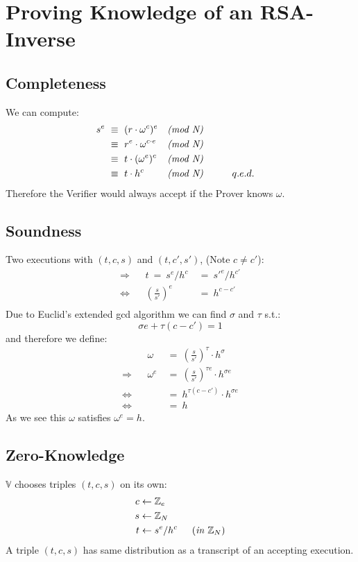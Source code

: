 \documentclass{report}
\begin{document}
	\section{Proving Knowledge of an RSA-Inverse}
	\startsection
		\subsection{Completeness}
		\startsection
			We can compute:
			\begin{align*}
				s^e \ & \equiv \ (r \cdot \omega^c) ^e & \textit{(mod N)} \\
				& \equiv \ r^e \cdot \omega ^{c \cdot e} & \textit{(mod N)} \\
				& \equiv \ t \cdot (\omega^e)^c & \textit{(mod N)} \\
				& \equiv \ t \cdot h^c & \textit{(mod N)} & \indent \indent q.e.d.
			\end{align*}
			Therefore the Verifier would always accept if the Prover knows $\omega$. \\
		\closesection
		\subsection{Soundness}
		\startsection
			Two executions with $(t,c,s)$ and $(t,c',s')$, (Note $c \neq c'$):
			\begin{align*}
				\Rightarrow && t \ = \ s^e / h^c \ & = \ s'^e / h^{c'} \\
				\Leftrightarrow && \left( \frac{s}{s'} \right) ^e \ & = \ h^{c-c'} \\
			\end{align*}
			Due to Euclid's extended gcd algorithm we can find $\sigma$ and $\tau$ s.t.:
			\[
				\sigma e + \tau(c-c') = 1
			\]
			and therefore we define:
			\begin{align*}
				&& \omega \ & = \ \left( \frac{s}{s'} \right) ^{\tau} \cdot h^{\sigma} \\
				\Rightarrow &&  \omega^e \ & = \ \left( \frac{s}{s'} \right) ^{\tau e} \cdot h^{\sigma e} \\
				\Leftrightarrow &&& = \ h^{\tau (c-c')} \cdot h^{\sigma e} \\
				\Leftrightarrow &&& = \ h
			\end{align*}
			As we see this $\omega$ satisfies $\omega^e = h$.
		\closesection
		\subsection{Zero-Knowledge}
		\startsection
			$\mathbb{V}$ chooses triples $(t,c,s)$ on its own:
			\begin{align*}
				c & \leftarrow \mathbb{Z}_e \\
				s & \leftarrow \mathbb{Z}_N \\
				t & \leftarrow s^e / h^c \indent (\textit{in } \mathbb{Z}_N)
			\end{align*}
			A triple $(t,c,s)$ has same distribution as a transcript of an accepting execution.
		\closesection
	\closesection
\end{document}
